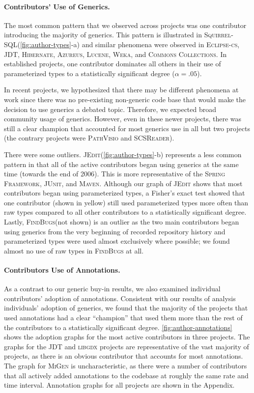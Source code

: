 \documentclass{svjour3}
\newcommand{\squirrelsql}{\textsc{Squirrel-SQL}\xspace}
\newcommand{\eclipsecs}{\textsc{Eclipse-cs}\xspace}
\newcommand{\azureus}{\textsc{Azureus}\xspace}
\newcommand{\jedit}{\textsc{JEdit}\xspace}
\newcommand{\spring}{the \textsc{Spring Framework}\xspace}
\newcommand{\junit}{\textsc{JUnit}\xspace}
\newcommand{\maven}{\textsc{Maven}\xspace}
\newcommand{\lucene}{\textsc{Lucene}\xspace}
\newcommand{\jdt}{\textsc{JDT}\xspace}
\newcommand{\hibernate}{\textsc{Hibernate}\xspace}
\newcommand{\commons}{\textsc{Commons Collections}\xspace}
\newcommand{\weka}{\textsc{Weka}\xspace}
\newcommand{\findbugs}{\textsc{FindBugs}\xspace}
\newcommand{\libgdx}{\textsc{libgdx}\xspace}
\newcommand{\migen}{\textsc{MiGen}\xspace}
\newcommand{\pathvisio}{\textsc{PathVisio}\xspace}
\newcommand{\scsreader}{\textsc{SCSReader}\xspace}
\begin{document}
\paragraph{Contributors' Use of Generics.} The most common pattern that we observed across projects was
one contributor introducing the majority of generics.  
This pattern is illustrated in \squirrelsql (\ref{fig:author-types}-a) and similar phenomena were observed in \eclipsecs, \jdt,
\hibernate, \azureus, \lucene, \weka, and \commons.  
In established projects, one contributor dominates all others in their use of parameterized types 
to a statistically significant degree ($\alpha=.05$).

In recent projects, we hypothesized that there may be different phenomena at work since there
was no pre-existing non-generic code base that would make the decision to use
generics a debated topic.  Therefore, we expected broad community usage of
generics.  However, even in these newer projects, there was still a clear
champion that accounted for most generics use in all but two projects (the
contrary projects were \pathvisio and \scsreader).

There were some outliers.  \jedit (\ref{fig:author-types}-b) represents a less common pattern in that all
of the active contributors began using generics at the same time (towards the
end of 2006).  This is more representative of \spring, \junit, and \maven.
Although our graph of \jedit shows that most contributors began
using parameterized types, a Fisher's exact test showed that one contributor
(shown in yellow) still used parameterized types more often than raw types
compared to all other contributors to a statistically significant degree.
Lastly, \findbugs (not shown) is an outlier as the two main contributors 
began using generics from the very beginning of
recorded repository history and parameterized types were used almost exclusively where
possible; we found almost no use of raw types in \findbugs at all.

\paragraph{Contributors Use of Annotations.}
As a contrast to our generic buy-in results, we also
examined individual contributors' adoption of annotations.  
Consistent with our results of analysis
individuals' adoption of generics, we found that the majority of the projects that used annotations had
a clear ``champion'' that used them more than the rest of the contributors to a statistically significant degree.
\autoref{fig:author-annotations} shows the adoption graphs for the most active contributors in three projects.
The graphs for the \jdt and \libgdx projects are representative of the vast majority of projects, as there is an obvious
contributor that accounts for most annotations.  The graph for \migen is uncharacteristic, as there were a number of 
contributors that all actively added annotations to the codebase at roughly the same rate and time interval.
Annotation graphs for all projects are shown in the Appendix.
\end{document}
